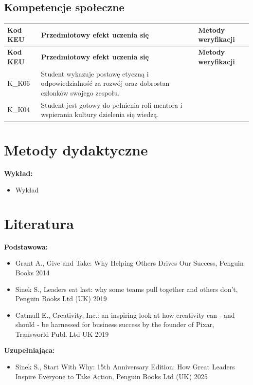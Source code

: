 \documentclass[12pt, a4paper]{article}
\newcommand{\thdrule}{\noalign{\global\setlength{\extrarowheight}{0pt}}}
\newcommand{\thdend}{\noalign{\global\setlength{\extrarowheight}{3pt}}}
\begin{document}
\subsection*{Kompetencje społeczne}
{\scriptsize
\begin{longtable}{m{1.6cm}m{9.0cm}m{4.2cm}}
\thdrule\toprule
\rowcolor{pjatkRed} {\color{white}\footnotesize\textbf{\vphantom{Ag}Kod KEU}} & {\color{white}\footnotesize\textbf{\vphantom{Ag}Przedmiotowy efekt uczenia się}} & {\color{white}\footnotesize\textbf{\vphantom{Ag}Metody weryfikacji}} \\
\midrule\thdend
\endfirsthead
\thdrule\toprule
\rowcolor{pjatkRed} {\color{white}\footnotesize\textbf{\vphantom{Ag}Kod KEU}} & {\color{white}\footnotesize\textbf{\vphantom{Ag}Przedmiotowy efekt uczenia się}} & {\color{white}\footnotesize\textbf{\vphantom{Ag}Metody weryfikacji}} \\
\midrule\thdend
\endhead
  \rowcolor{tableRowLight} K\_K06 & Student wykazuje postawę etyczną i odpowiedzialność za rozwój oraz dobrostan członków swojego zespołu. &  \\
  \rowcolor{tableRowAlt} K\_K04 & Student jest gotowy do pełnienia roli mentora i wspierania kultury dzielenia się wiedzą. &  \\
\bottomrule
\end{longtable}}

\section{Metody dydaktyczne}

\textbf{Wykład:}
\begin{itemize}
  \item Wykład
\end{itemize}
\vspace{4pt}


\section{Literatura}

\textbf{Podstawowa:}
\begin{itemize}
  \item Grant A., Give and Take: Why Helping Others Drives Our Success, Penguin Books 2014
  \item Sinek S., Leaders eat last: why some teams pull together and others don't, Penguin Books Ltd (UK) 2019
  \item Catmull E., Creativity, Inc.: an inspiring look at how creativity can - and should - be harnessed for business success by the founder of Pixar, Transworld Publ. Ltd UK 2019
\end{itemize}

\textbf{Uzupełniająca:}
\begin{itemize}
  \item Sinek S., Start With Why: 15th Anniversary Edition: How Great Leaders Inspire Everyone to Take Action, Penguin Books Ltd (UK) 2025
\end{itemize}
\end{document}

